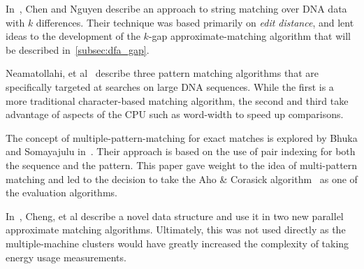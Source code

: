 In~\cite{chen2021string}, Chen and Nguyen describe an approach to string matching over DNA data with $k$ differences. Their technique was based primarily on \textit{edit distance}, and lent ideas to the development of the $k$-gap approximate-matching algorithm that will be described in~\ref{subsec:dfa_gap}.

Neamatollahi, et al~\cite{neamatollahi} describe three pattern matching algorithms that are specifically targeted at searches on large DNA sequences. While the first is a more traditional character-based matching algorithm, the second and third take advantage of aspects of the CPU such as word-width to speed up comparisons.

The concept of multiple-pattern-matching for exact matches is explored by Bhuka and Somayajulu in~\cite{bhukya}. Their approach is based on the use of pair indexing for both the sequence and the pattern. This paper gave weight to the idea of multi-pattern matching and led to the decision to take the Aho \& Corasick algorithm~\cite{aho} as one of the evaluation algorithms.

In~\cite{cheng2003approximate}, Cheng, et al describe a novel data structure and use it in two new parallel approximate matching algorithms. Ultimately, this was not used directly as the multiple-machine clusters would have greatly increased the complexity of taking energy usage measurements.
